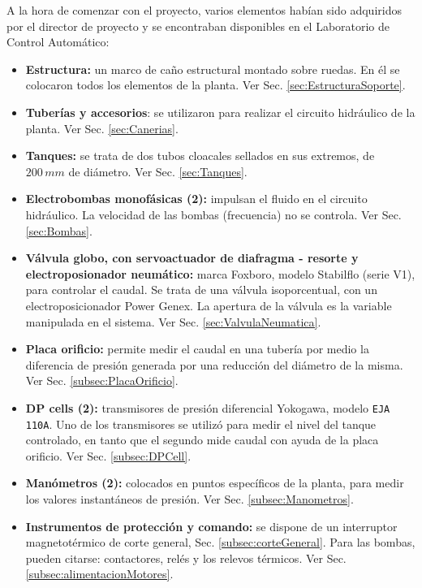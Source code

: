 A la hora de comenzar con el proyecto, varios elementos habían
sido adquiridos por el director de proyecto y se encontraban
disponibles en el Laboratorio de Control Automático:
\begin{itemize}
  \item \textbf{Estructura:} un marco de caño estructural montado sobre
  ruedas. En él se colocaron todos los elementos de la planta.
  Ver Sec. \ref{sec:EstructuraSoporte}.

  \item \textbf{Tuberías y accesorios}: se utilizaron para realizar el
  circuito hidráulico de la planta. Ver Sec. \ref{sec:Canerias}.

  \item \textbf{Tanques:} se trata de dos tubos cloacales sellados en sus
  extremos, de $200\,mm$ de diámetro. Ver Sec. \ref{sec:Tanques}.

  \item \textbf{Electrobombas monofásicas (2):} impulsan el fluido
  en el circuito hidráulico.
  La velocidad de las bombas (frecuencia) no se controla.
  Ver Sec. \ref{sec:Bombas}.

  \item \textbf{Válvula globo, con servoactuador de diafragma - resorte y
electroposionador neumático:} marca Foxboro, modelo
  Stabilflo (serie V1), para controlar el caudal.
  Se trata de una válvula isoporcentual, con un electroposicionador
  Power Genex.
  La apertura de la válvula es la variable manipulada en
  el sistema.
  Ver Sec. \ref{sec:ValvulaNeumatica}.

  \item \textbf{Placa orificio:} permite medir el
  caudal en una tubería por medio la diferencia de presión generada por una
  reducción del diámetro de la misma. Ver Sec. \ref{subsec:PlacaOrificio}.

  \item \textbf{DP cells (2):} transmisores de presión
  diferencial Yokogawa, modelo \verb|EJA 110A|.
  Uno de los transmisores se utilizó para medir el nivel del tanque
  controlado, en tanto que el segundo mide caudal con ayuda de la placa
  orificio.
  Ver Sec. \ref{subsec:DPCell}.

  \item \textbf{Manómetros (2):} colocados en
  puntos específicos de la planta, para medir los valores instantáneos de
  presión.
  Ver Sec. \ref{subsec:Manometros}.

  \item \textbf{Instrumentos de protección y comando:}
  se dispone de un interruptor magnetotérmico de corte general,
  Sec. \ref{subsec:corteGeneral}.
  Para las bombas, pueden citarse: contactores, relés y los relevos térmicos.
  Ver Sec. \ref{subsec:alimentacionMotores}.


\end{itemize}

